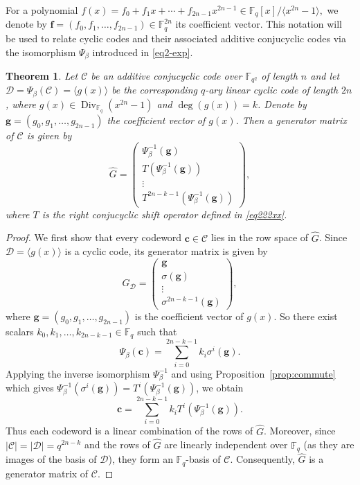 \documentclass{aims}
\numberwithin{equation}{section}
\newtheorem{theorem}{Theorem}[section]
\theoremstyle{definition}
\newcommand{\F}{\mathbb{F}}
\newcommand{\Div}{\operatorname{Div}}
\begin{document}
For a polynomial
$
f(x) = f_0 + f_1x + \cdots + f_{2n-1}x^{2n-1} \in \F_q[x] / \langle x^{2n}-1 \rangle,
$
we denote by $\pmb{f} = (f_0, f_1, \dots, f_{2n-1}) \in \F_q^{2n}$ its coefficient vector. This notation will be used to relate cyclic codes and their associated additive conjucyclic codes via the isomorphism $\Psi_\beta$ introduced in \eqref{eq2-exp}.

\begin{theorem}\label{thm:generator}
	Let \(\mathcal{C}\) be an additive conjucyclic code over \(\F_{q^2}\) of length \(n\) and let \(\mathcal{D} = \Psi_\beta(\mathcal{C}) = \langle g(x) \rangle\) be the corresponding \(q\)-ary linear cyclic code of length \(2n\), where \(g(x) \in \Div_{\F_q}(x^{2n}-1)\) and \(\deg(g(x)) = k\). Denote by \(\pmb{g} = (g_0, g_1, \dots, g_{2n-1})\) the coefficient vector of \(g(x)\). Then a generator matrix of \(\mathcal{C}\) is given by
	\[
	\hat{G} = \begin{pmatrix}
		\Psi_\beta^{-1}(\pmb{g}) \\
		T(\Psi_\beta^{-1}(\pmb{g})) \\
		\vdots \\
		T^{2n-k-1}(\Psi_\beta^{-1}(\pmb{g}))
	\end{pmatrix},
	\]
	where \(T\) is the right conjucyclic shift operator defined in \eqref{eq222xx}.
\end{theorem}

\begin{proof}
	We first show that every codeword \(\mathbf{c} \in \mathcal{C}\) lies in the row space of \(\hat{G}\). Since \(\mathcal{D} = \langle g(x) \rangle\) is a cyclic code, its generator matrix is given by
	\[
	G_{\mathcal{D}} = \begin{pmatrix}
		\pmb{g} \\
		\sigma(\pmb{g}) \\
		\vdots \\
		\sigma^{2n-k-1}(\pmb{g})
	\end{pmatrix},
	\]
	where \(\pmb{g} = (g_0, g_1, \dots, g_{2n-1})\) is the coefficient vector of \(g(x)\). So there exist scalars \(k_0, k_1, \dots, k_{2n-k-1} \in \F_q\) such that
	\[
	\Psi_\beta(\mathbf{c}) = \sum_{i=0}^{2n-k-1} k_i \sigma^i(\pmb{g}).
	\]
	Applying the inverse isomorphism \(\Psi_\beta^{-1}\) and using Proposition~\ref{prop:commute} which gives \(\Psi_\beta^{-1}(\sigma^i(\pmb{g})) = T^i(\Psi_\beta^{-1}(\pmb{g}))\), we obtain
	\[
	\mathbf{c} = \sum_{i=0}^{2n-k-1} k_i T^i(\Psi_\beta^{-1}(\pmb{g})).
	\]
	Thus each codeword is a linear combination of the rows of \(\hat{G}\). Moreover, since \(|\mathcal{C}| = |\mathcal{D}| = q^{2n-k}\) and the rows of \(\hat{G}\) are linearly independent over \(\F_q\) (as they are images of the basis of \(\mathcal{D}\)), they form an \(\F_q\)-basis of \(\mathcal{C}\). Consequently, \(\hat{G}\) is a generator matrix of \(\mathcal{C}\).
\end{proof}
\end{document}
